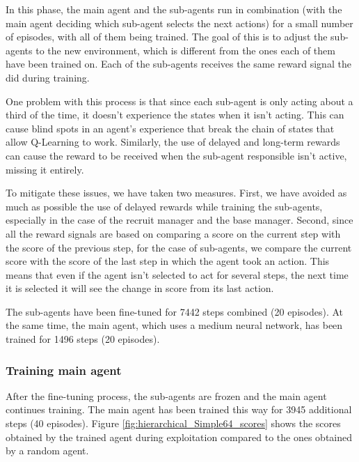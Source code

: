 In this phase, the main agent and the sub-agents run in combination (with the main agent deciding which sub-agent selects the next actions) for a small number of episodes, with all of them being trained. The goal of this is to adjust the sub-agents to the new environment, which is different from the ones each of them have been trained on. Each of the sub-agents receives the same reward signal the did during training.

One problem with this process is that since each sub-agent is only acting about a third of the time, it doesn't experience the states when it isn't acting. This can cause blind spots in an agent's experience that break the chain of states that allow Q-Learning to work. Similarly, the use of delayed and long-term rewards can cause the reward to be received when the sub-agent responsible isn't active, missing it entirely.

To mitigate these issues, we have taken two measures. First, we have avoided as much as possible the use of delayed rewards while training the sub-agents, especially in the case of the recruit manager and the base manager. Second, since all the reward signals are based on comparing a score on the current step with the score of the previous step, for the case of sub-agents, we compare the current score with the score of the last step in which the agent took an action. This means that even if the agent isn't selected to act for several steps, the next time it is selected it will see the change in score from its last action.

The sub-agents have been fine-tuned for 7442 steps combined (20 episodes). At the same time, the main agent, which uses a medium neural network, has been trained for 1496 steps (20 episodes).

\subsubsection*{Training main agent}

After the fine-tuning process, the sub-agents are frozen and the main agent continues training. The main agent has been trained this way for 3945 additional steps (40 episodes). Figure \ref{fig:hierarchical_Simple64_scores} shows the scores obtained by the trained agent during exploitation compared to the ones obtained by a random agent.


